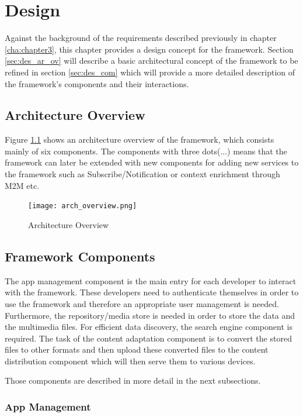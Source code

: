 \chapter{Design\label{cha:chapter4}}
Against the background of the requirements described previously in chapter \ref{cha:chapter3}, this chapter provides a design concept for the framework. Section \ref{sec:des_ar_ov} will describe a basic architectural concept of the framework to be refined in section \ref{sec:des_com} which will provide a more detailed description of the framework's components and their interactions. 

\section{Architecture Overview\label{sec:des_ar_ov}}
Figure \ref{fig:arch_overview} shows an architecture overview of the framework, which consists mainly of six components. The components with three dots(...) means that the framework can later be extended with new components for adding new services to the framework such as Subscribe/Notification or context enrichment through \ac{M2M} etc.

\begin{figure}[htb]
  \centering
  \texttt{[image: arch\_overview.png]}\\
  \caption{Architecture Overview}
  \label{fig:arch_overview}
\end{figure}

\section{Framework Components\label{sec:des_com}}
The app management component is the main entry for each developer to interact with the framework. These developers need to authenticate themselves in order to use the framework and therefore an appropriate user management is needed. Furthermore, the repository/media store is needed in order to store the data and the multimedia files. For efficient data discovery, the search engine component  is required. The task of the content adaptation component is to convert the stored files to other formats and then upload these converted files to the content distribution component which will then serve them to various devices.

Those components are described in more detail in the next subsections.
 
\subsection{App Management\label{sec:des_app_man}}

